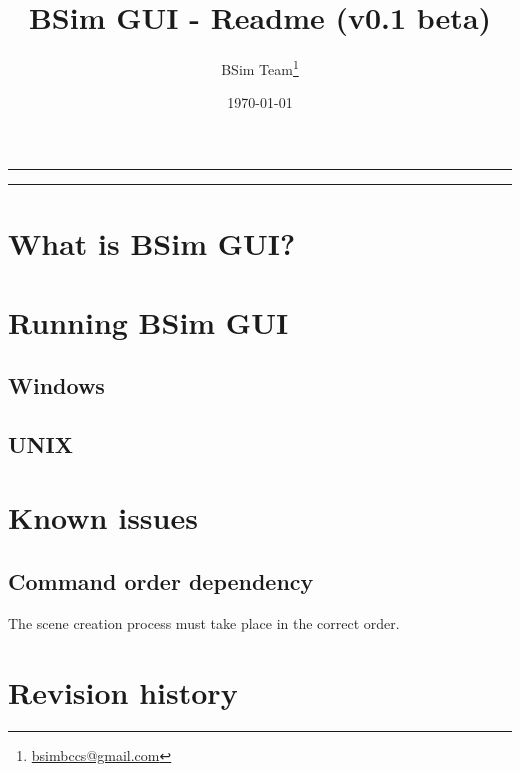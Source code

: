 \documentclass[a4paper,11pt]{article}
\title{BSim GUI - Readme (v0.1 beta)}
\author{BSim Team\footnote{\href{mailto:bsimbccs@gmail.com}{bsimbccs@gmail.com}}}
\date{\today}
\begin{document}
\maketitle
\rule{0.9\textwidth}{0.5pt}
\tableofcontents
\vspace{1em}
\rule{0.9\textwidth}{0.5pt}

\section{What is BSim GUI?}

\section{Running BSim GUI}

\subsection{Windows}

\subsection{UNIX}

\section{Known issues}

\subsection{Command order dependency}
The scene creation process must take place in the correct order.


\section{Revision history}
\end{document}
